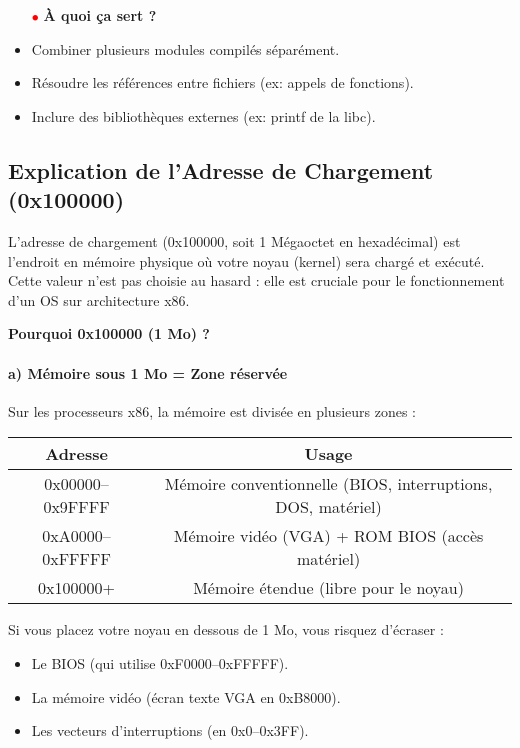 \documentclass{article}
\begin{document}
\begin{itemize}
    \item[\textbf{\textcolor{red}{$\bullet$}}] \textbf{À quoi ça sert ?}
    \item Combiner plusieurs modules compilés séparément.
    \item Résoudre les références entre fichiers (ex: appels de fonctions).
    \item Inclure des bibliothèques externes (ex: printf de la libc).
\end{itemize}



\subsection*{Explication de l'Adresse de Chargement (0x100000)}

L’adresse de chargement (0x100000, soit 1 Mégaoctet en hexadécimal) est l’endroit en mémoire physique où votre noyau (kernel) sera chargé et exécuté. Cette valeur n’est pas choisie au hasard : elle est cruciale pour le fonctionnement d’un OS sur architecture x86.

\textbf{Pourquoi 0x100000 (1 Mo) ?}

\paragraph{a) Mémoire sous 1 Mo = Zone réservée}

Sur les processeurs x86, la mémoire est divisée en plusieurs zones :

\begin{center}
\begin{tabular}{|c|c|}
\hline
\textbf{Adresse} & \textbf{Usage} \\
\hline
0x00000–0x9FFFF & Mémoire conventionnelle (BIOS, interruptions, DOS, matériel) \\
0xA0000–0xFFFFF & Mémoire vidéo (VGA) + ROM BIOS (accès matériel) \\
0x100000+ & Mémoire étendue (libre pour le noyau) \\
\hline
\end{tabular}
\end{center}

Si vous placez votre noyau en dessous de 1 Mo, vous risquez d’écraser :

\begin{itemize}
    \item Le BIOS (qui utilise 0xF0000–0xFFFFF).
    \item La mémoire vidéo (écran texte VGA en 0xB8000).
    \item Les vecteurs d’interruptions (en 0x0–0x3FF).
\end{itemize}
\end{document}
